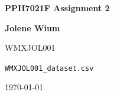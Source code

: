 \documentclass{article}
\begin{document}
\begin{titlepage}
    \begin{center}
        \vspace*{3cm}
            
        \Huge
        \textbf{PPH7021F Assignment 2}
            
        \vspace{1.5cm}

        \huge
            
        \textbf{Jolene Wium}                      %
        \vspace{1cm}
        \Large


        WMXJOL001
            
        
        \texttt{WMXJOL001\_dataset.csv}
            
        \vspace{1cm}
            
        
        \Large
        
        \today
            
    \end{center}
\end{titlepage}
\newpage
\newpage

\newpage
\tableofcontents
\newpage

\listoftables
\listoffigures
\newpage






\end{document}

